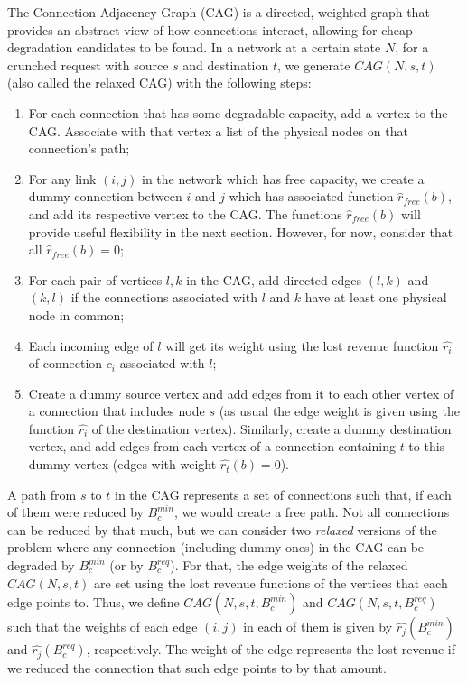 \documentclass[journal]{IEEEtran}
\begin{document}
The Connection Adjacency Graph (CAG) is a directed, weighted graph that provides an abstract view of how connections interact, allowing for cheap degradation candidates to be found. In a network at a certain state $N$, for a crunched request with source $s$ and destination $t$, we generate $CAG(N, s, t)$ (also called the relaxed CAG) with the following steps:
\begin{enumerate}
 \item For each connection that has some degradable capacity, add a vertex to the CAG. Associate with that vertex a list of the physical nodes on that connection's path;%
 \item For any link $(i,j)$ in the network which has free capacity, we create a dummy connection between $i$ and $j$ which has associated function $\widehat{r}_{free}(b)$, %
and add its respective vertex to the CAG. The functions $\widehat{r}_{free}(b)$ will provide useful flexibility in the next section. However, for now, consider that all $\widehat{r}_{free}(b) = 0$;
 \item For each pair of vertices $l,k$ in the CAG, add directed edges $(l,k)$ and $(k,l)$ if the connections associated with $l$ and $k$ have at least one physical node in common;
 \item Each incoming edge of $l$ will get its weight using the lost revenue function $\widehat{r_i}$ of connection $c_i$ associated with $l$;
 \item Create a dummy source vertex and add edges from it to each other vertex of a connection that includes node $s$ (as usual the edge weight is given using the function $\widehat{r_i}$ of the destination vertex). Similarly, create a dummy destination vertex, and add edges from each vertex of a connection containing $t$ to this dummy vertex (edges with weight $\widehat{r_{t}}(b)=0$).
\end{enumerate}

A path from $s$ to $t$ in the CAG represents a set of connections such that, if each of them were reduced by $B^{min}_c$, we would create a free path. Not all connections can be reduced by that much, but we can consider two \textit{relaxed} versions of the problem where any connection (including dummy ones) in the CAG can be degraded by $B^{min}_c$ (or by $B^{req}_c$). For that, the edge weights of the relaxed $CAG(N, s, t)$ are set using the lost revenue functions of the vertices that each edge points to. Thus, we define $CAG(N, s, t, B^{min}_{c})$ and $CAG(N, s, t, B^{req}_{c})$ such that the weights of each edge $(i,j)$ in each of them is given by $\widehat{r_j}(B^{min}_{c})$ and $\widehat{r_j}(B^{req}_{c})$, respectively. The weight of the edge represents the lost revenue if we reduced the connection that such edge points to by that amount.
\end{document}
